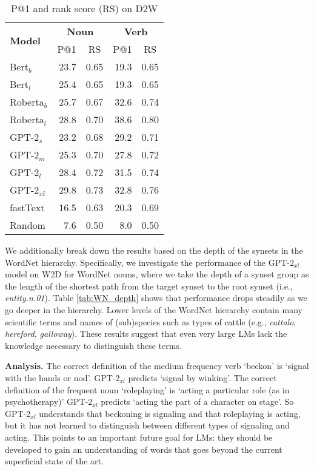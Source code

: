 \documentclass[11pt,a4paper]{article}
\begin{document}
\begin{table}
    \centering
    \begin{tabular}{l|rrrr}
        \hline
         \multirow{2}{*}{\textbf{Model}} & \multicolumn{2}{c}{\textbf{Noun}} & \multicolumn{2}{c}{\textbf{Verb}} \\
         & \multicolumn{1}{c}{P@1} & \multicolumn{1}{c}{RS} & \multicolumn{1}{c}{P@1} & \multicolumn{1}{c}{RS} \\ \hline
     Bert$_{b}$ & 23.7 & 0.65 & 19.3 & 0.65 \\
     Bert$_{l}$ & 25.4 & 0.65 & 19.3 & 0.65 \\
     Roberta$_{b}$ & 25.7 & 0.67 & 32.6 & 0.74 \\
     Roberta$_{l}$ & 28.8 & 0.70 & 38.6 & 0.80 \\ \hline
     GPT-2$_{s}$ & 23.2 & 0.68 & 29.2 & 0.71 \\
     GPT-2$_{m}$ & 25.3 & 0.70 & 27.8 & 0.72 \\
     GPT-2$_{l}$ & 28.4 & 0.72 & 31.5 & 0.74 \\
     GPT-2$_{xl}$ & 29.8 & 0.73 & 32.8 & 0.76 \\ \hline 
     fastText & 16.5 & 0.63 & 20.3 & 0.69 \\ \hline 
     Random & 7.6 & 0.50 & 8.0 & 0.50 \\\hline
     
    \end{tabular}
    \caption{P@1 and rank score (RS) on D2W}
    \label{tab:results_D2W}
\end{table}

We additionally break down the results
based on the depth of the synsets in the WordNet
hierarchy. Specifically, we investigate the performance of
the GPT-2$_{xl}$ model on W2D for WordNet nouns, where we
take the depth of a synset group as the length of the
shortest path from the target synset to the root synset
(i.e., \textit{entity.n.01}). Table \ref{tab:WN_depth}
shows that
performance drops steadily as we go deeper in the
hierarchy. Lower levels of the WordNet hierarchy contain
many scientific terms and names of (sub)species such as types
of cattle (e.g., \textit{cattalo},
\textit{hereford}, \textit{galloway}). These results suggest that even very large LMs
lack the knowledge necessary to distinguish these terms.

\textbf{Analysis.}
The correct definition of the medium frequency verb `beckon' is  `signal with the hands or nod'. GPT-2$_{xl}$ predicts  `signal by winking'.
The correct definition of the frequent noun `roleplaying' is `acting a particular role (as in psychotherapy)' GPT-2$_{xl}$ predicts `acting the part of a character on stage'.
So GPT-2$_{xl}$ understands that beckoning is signaling and that roleplaying is acting, but it has not learned to distinguish between different types of signaling and acting.
This points to an important future goal for LMs: they should be developed to gain an understanding of words that goes beyond the current superficial state of the art.
\end{document}
